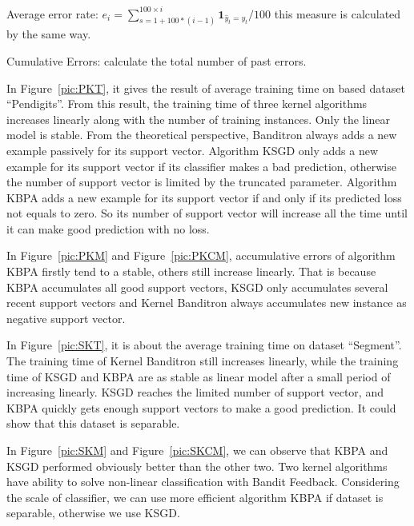 \documentclass[preprint,12pt,authoryear]{elsarticle}
\begin{document}
Average error rate: $e_i = \sum_{s=1+100*(i-1)}^{100\times i}\mathbf{1}_{\hat{y}_t = y_t}/100$ this measure is calculated by the same way.

Cumulative Errors: calculate the total number of past errors.

In Figure~\ref{pic:PKT}, it gives the result of average training time on based dataset ``Pendigits''.  From this result, the training time of three kernel algorithms increases linearly along with the number of training instances. Only the linear model is stable. From the theoretical perspective, Banditron always adds a new example passively for its support vector. Algorithm KSGD only adds a new example for its support vector if its classifier makes a bad prediction, otherwise the number of support vector is limited by the truncated parameter. Algorithm KBPA adds a new example for its support vector if and only if its predicted loss not equals to zero. So its number of support vector will increase all the time until it can make good prediction with no loss.

In Figure~\ref{pic:PKM} and Figure~\ref{pic:PKCM}, accumulative errors of algorithm KBPA firstly tend to a stable, others still increase linearly. That is because KBPA accumulates all good support vectors, KSGD only accumulates several recent support vectors and Kernel Banditron always accumulates new instance as negative support vector.

In Figure~\ref{pic:SKT}, it is about the average training time on dataset ``Segment''.  The training time of Kernel Banditron still increases linearly, while the training time of KSGD and KBPA are as stable as linear model after a small period of increasing linearly. KSGD reaches the limited number of support vector, and KBPA quickly gets enough support vectors to make a good prediction. It could show that this dataset is separable. 

In Figure~\ref{pic:SKM} and Figure~\ref{pic:SKCM}, we can observe that KBPA and KSGD performed obviously better than the other two.  Two kernel algorithms have ability to solve non-linear classification with Bandit Feedback. Considering the scale of classifier, we can use more efficient algorithm KBPA if dataset is separable, otherwise we use KSGD.
\end{document}
